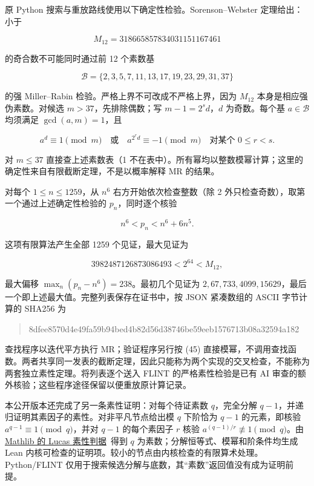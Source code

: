 \documentclass[UTF8,zihao=-4,fontset=fandol]{ctexart}
\begin{document}
原 Python 搜索与重放路线使用以下确定性检验。Sorenson–Webster 定理给出：小于

\[
M_{12}=318665857834031151167461
\]

的奇合数不可能同时通过前 12 个素数基

\[
\mathcal B=\{2,3,5,7,11,13,17,19,23,29,31,37\}
\]

的强 Miller–Rabin 检验。严格上界不可改成不严格上界，因为 \(M_{12}\) 本身是相应强伪素数。对候选 \(m>37\)，先排除偶数；写 \(m-1=2^s d\)，\(d\) 为奇数。每个基 \(a\in\mathcal B\) 均须满足 \(\gcd(a,m)=1\)，且

\[
a^d\equiv1\pmod m
\quad\text{或}\quad
a^{2^r d}\equiv-1\pmod m\quad\text{对某个 }0\le r<s. \tag{45}
\]

对 \(m\le37\) 直接查上述素数表（1 不在表中）。所有幂均以整数模幂计算；这里的确定性来自有限截断定理，不是以概率解释 MR 的结果。

对每个 \(1\le n\le1259\)，从 \(n^6\) 右方开始依次检查整数（除 2 外只检查奇数），取第一个通过上述确定性检验的 \(p_n\)，同时逐个核验

\[
n^6<p_n<n^6+6n^5. \tag{46}
\]

这项有限算法产生全部 1259 个见证，最大见证为

\[
3982487126873086493<2^{64}<M_{12},
\]

最大偏移 \(\max_n(p_n-n^6)=238\)。最初几个见证为 \(2,67,733,4099,15629\)，最后一个即上述最大值。完整列表保存在证书中，按 JSON 紧凑数组的 ASCII 字节计算的 SHA256 为

\begin{quote}{\ttfamily\scriptsize 8dfee8570d4e49fa\allowbreak{}59b94bed4b82d56d\allowbreak{}38746be59eeb1576\allowbreak{}713b08a32594a182}\end{quote}

查找程序以迭代平方执行 MR；验证程序另行按 (45) 直接模幂，不调用查找函数。两者共享同一发表的截断定理，因此只能称为两个实现的交叉检查，不能称为两套独立素性定理。将列表逐个送入 FLINT 的严格素性检验是已有 AI 审查的额外核验；这些程序途径保留以便重放原计算记录。

本公开版本还完成了另一条素性证明：对每个待证素数 \(q\)，完全分解 \(q-1\)，并递归证明其素因子的素性。对非平凡节点给出模 \(q\) 下阶恰为 \(q-1\) 的元素，即核验 \(a^{q-1}\equiv1\pmod q\)，并对 \(q-1\) 的每个素因子 \(r\) 核验 \(a^{(q-1)/r}\not\equiv1\pmod q\)。由 \href{https://github.com/leanprover-community/mathlib4/blob/9d581dfff2e41de989072ea63abf3daf69311520/Mathlib/NumberTheory/LucasPrimality.lean}{Mathlib 的 Lucas 素性判据}~\cite{Mathlib}得到 \(q\) 为素数；分解恒等式、模幂和阶条件均生成 Lean 内核可检查的证明项。较小的节点由内核检查的有限算术处理。Python/FLINT 仅用于搜索候选分解与底数，其“素数”返回值没有成为证明前提。
\end{document}
